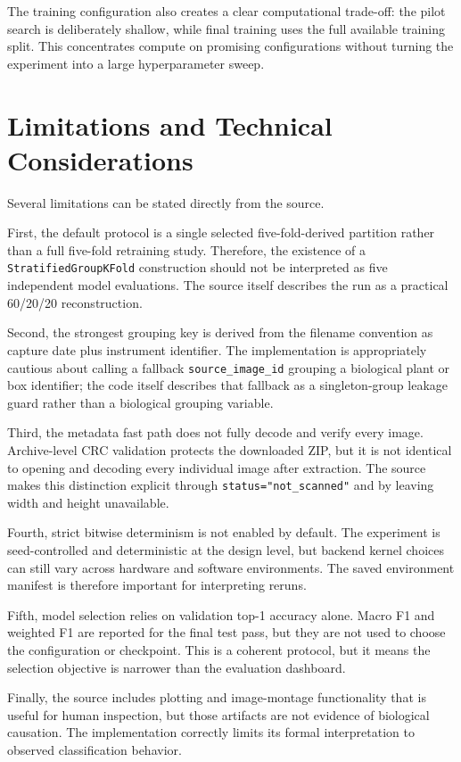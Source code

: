 \documentclass[11pt,a4paper]{article}
\begin{document}
The training configuration also creates a clear computational trade-off: the pilot search is deliberately shallow, while final training uses the full available training split. This concentrates compute on promising configurations without turning the experiment into a large hyperparameter sweep.

\section{Limitations and Technical Considerations}
Several limitations can be stated directly from the source.

First, the default protocol is a single selected five-fold-derived partition rather than a full five-fold retraining study. Therefore, the existence of a \texttt{StratifiedGroupKFold} construction should not be interpreted as five independent model evaluations. The source itself describes the run as a practical 60/20/20 reconstruction.

Second, the strongest grouping key is derived from the filename convention as capture date plus instrument identifier. The implementation is appropriately cautious about calling a fallback \texttt{source\_image\_id} grouping a biological plant or box identifier; the code itself describes that fallback as a singleton-group leakage guard rather than a biological grouping variable.

Third, the metadata fast path does not fully decode and verify every image. Archive-level CRC validation protects the downloaded ZIP, but it is not identical to opening and decoding every individual image after extraction. The source makes this distinction explicit through \texttt{status="not\_scanned"} and by leaving width and height unavailable.

Fourth, strict bitwise determinism is not enabled by default. The experiment is seed-controlled and deterministic at the design level, but backend kernel choices can still vary across hardware and software environments. The saved environment manifest is therefore important for interpreting reruns.

Fifth, model selection relies on validation top-1 accuracy alone. Macro F1 and weighted F1 are reported for the final test pass, but they are not used to choose the configuration or checkpoint. This is a coherent protocol, but it means the selection objective is narrower than the evaluation dashboard.

Finally, the source includes plotting and image-montage functionality that is useful for human inspection, but those artifacts are not evidence of biological causation. The implementation correctly limits its formal interpretation to observed classification behavior.
\end{document}
